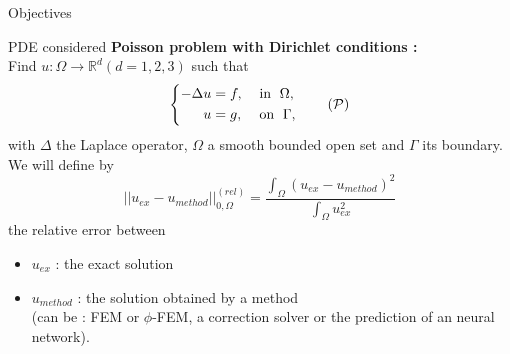 \begin{frame}{Objectives}
    
\end{frame}

\begin{frame}{PDE considered}
    \textbf{Poisson problem with Dirichlet conditions :} \\
    Find $u : \Omega \rightarrow \mathbb{R}^d (d=1,2,3)$ such that
    \begin{equation}
        \left\{
        \begin{aligned}
            -\Delta u &= f, \; &&\text{in } \; \Omega, \\
            u&=g, \; &&\text{on } \; \Gamma,
        \end{aligned}
        \right. \tag{$\mathcal{P}$} \label{pb_initial}
    \end{equation}
    with $\Delta$ the Laplace operator, $\Omega$ a smooth bounded open set and $\Gamma$ its boundary. \\
    We will define by
    \begin{equation*}
        ||u_{ex}-u_{method}||_{0,\Omega}^{(rel)}=\frac{\int_\Omega (u_{ex}-u_{method})^2}{\int_\Omega u_{ex}^2}
    \end{equation*}
    the relative error between
    \begin{itemize}
        \item $u_{ex}$ : the exact solution  
        \item $u_{method}$ : the solution obtained by a method \\
        (can be : FEM or $\phi$-FEM, a correction solver or the prediction of an neural network).
    \end{itemize}
\end{frame}
	
